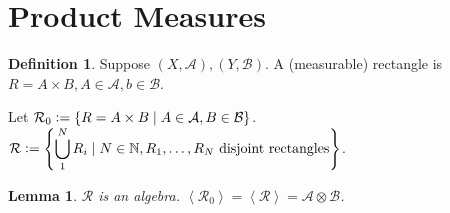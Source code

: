 \documentclass{report}
\newcommand{\N}{\mathbb{N}}
\newcommand{\cA}{\mathcal{A}}
\newcommand{\cB}{\mathcal{B}}
\newcommand{\gen}[1]{\left\langle #1 \right\rangle}
\newcommand{\defeq}{\vcentcolon=}
\newtheorem{lemma}[theorem]{Lemma}
\theoremstyle{definition}
\newtheorem{definition}[theorem]{Definition}
\theoremstyle{remark}
\begin{document}
\section{Product Measures}
\begin{definition}
	Suppose $(X, \cA), (Y, \cB)$. A (measurable) rectangle is $R = A \times B, A \in \cA, b \in \cB$.

	Let $\displaystyle \mathcal{R}_0 \defeq \left\lbrace R = A \times B \mid A \in \cA, B \in \cB \right\rbrace$.\\

	$\displaystyle \mathcal{R} \defeq \left\lbrace \bigcup_1^N R_i \mid N \in \N, R_1, \ldots, R_N \text{ disjoint rectangles} \right\rbrace$.

\end{definition}

\begin{lemma}
	$\mathcal{R}$ is an algebra. $\gen{\mathcal{R}_0} = \gen{\mathcal{R}} = \cA \otimes \cB$.
\end{lemma}
\end{document}
